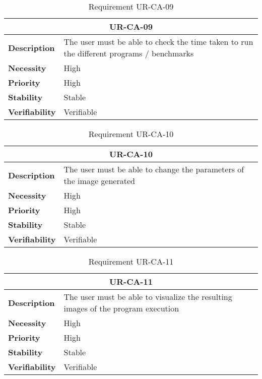 \begin{table}[H]
    \centering
    \begin{tabular}{l p{10cm}}
        \toprule
        \multicolumn{2}{c}{UR-CA-09} \\
        \toprule
        \textbf{Description}        & The user must be able to check the time taken to run the different programs / benchmarks \\
        \textbf{Necessity}          & High   \\
        \textbf{Priority}           & High   \\
        \textbf{Stability}          & Stable \\
        \textbf{Verifiability}      & Verifiable \\
    \end{tabular}
    \caption{Requirement UR-CA-09}
    \label{tab:ur-ca-09}
\end{table}

\begin{table}[H]
    \centering
    \begin{tabular}{l p{10cm}}
        \toprule
        \multicolumn{2}{c}{UR-CA-10} \\
        \toprule
        \textbf{Description}        & The user must be able to change the parameters of the image generated \\
        \textbf{Necessity}          & High   \\
        \textbf{Priority}           & High   \\
        \textbf{Stability}          & Stable \\
        \textbf{Verifiability}      & Verifiable \\
    \end{tabular}
    \caption{Requirement UR-CA-10}
    \label{tab:ur-ca-10}
\end{table}

\begin{table}[H]
    \centering
    \begin{tabular}{l p{10cm}}
        \toprule
        \multicolumn{2}{c}{UR-CA-11} \\
        \toprule
        \textbf{Description}        & The user must be able to visualize the resulting images of the program execution \\
        \textbf{Necessity}          & High   \\
        \textbf{Priority}           & High   \\
        \textbf{Stability}          & Stable \\
        \textbf{Verifiability}      & Verifiable \\
    \end{tabular}
    \caption{Requirement UR-CA-11}
    \label{tab:ur-ca-11}
\end{table}

